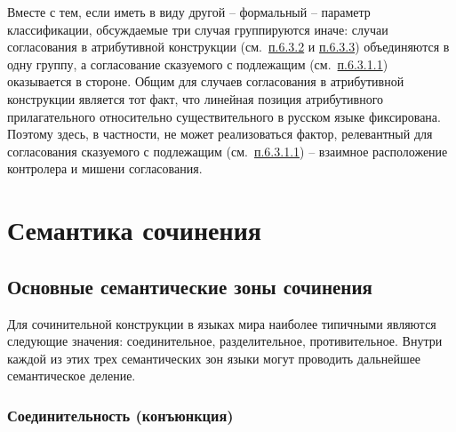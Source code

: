 Вместе с тем, если иметь в виду другой -- формальный -- параметр
классификации, обсуждаемые три случая группируются иначе: случаи
согласования в атрибутивной конструкции (см.~\underline{п.6.3.2} и
\underline{п.6.3.3}) объединяются в одну группу, а согласование
сказуемого с подлежащим (см.~\underline{п.6.3.1.1}) оказывается в
стороне. Общим для случаев согласования в атрибутивной конструкции
является тот факт, что линейная позиция атрибутивного прилагательного
относительно существительного в русском языке фиксирована. Поэтому
здесь, в частности, не может реализоваться фактор, релевантный для
согласования сказуемого с подлежащим (см.~\underline{п.6.3.1.1}) --
взаимное расположение контролера и мишени согласования.

\hypertarget{ux441ux435ux43cux430ux43dux442ux438ux43aux430-ux441ux43eux447ux438ux43dux435ux43dux438ux44f}{%
\section{Семантика
сочинения}\label{ux441ux435ux43cux430ux43dux442ux438ux43aux430-ux441ux43eux447ux438ux43dux435ux43dux438ux44f}}

\hypertarget{ux43eux441ux43dux43eux432ux43dux44bux435-ux441ux435ux43cux430ux43dux442ux438ux447ux435ux441ux43aux438ux435-ux437ux43eux43dux44b-ux441ux43eux447ux438ux43dux435ux43dux438ux44f}{%
\subsection{Основные семантические зоны
сочинения}\label{ux43eux441ux43dux43eux432ux43dux44bux435-ux441ux435ux43cux430ux43dux442ux438ux447ux435ux441ux43aux438ux435-ux437ux43eux43dux44b-ux441ux43eux447ux438ux43dux435ux43dux438ux44f}}

Для сочинительной конструкции в языках мира наиболее типичными являются
следующие значения: соединительное, разделительное, противительное.
Внутри каждой из этих трех семантических зон языки могут проводить
дальнейшее семантическое деление.

\hypertarget{ux441ux43eux435ux434ux438ux43dux438ux442ux435ux43bux44cux43dux43eux441ux442ux44c-ux43aux43eux43dux44aux44eux43dux43aux446ux438ux44f}{%
\subsubsection{Соединительность
(конъюнкция)}\label{ux441ux43eux435ux434ux438ux43dux438ux442ux435ux43bux44cux43dux43eux441ux442ux44c-ux43aux43eux43dux44aux44eux43dux43aux446ux438ux44f}}

